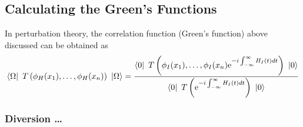\documentclass[11pt, notitlepage]{report}
\newcommand{\e}{\mathrm{e}}
\numberwithin{equation}{section}
\begin{document}
\subsection{Calculating the Green's Functions}
In perturbation theory, the correlation function (Green's function) above discussed can be obtained as 
\begin{equation}
    \bra{\Omega} ~T\left( \phi_H(x_1),\ldots,\phi_H(x_n)  \right)~ \ket{\Omega} = \frac{\bra{0} ~T\left( \phi_I(x_1),\ldots,\phi_I(x_n)  \e^{-i\int_{-\infty}^{\infty}H_I(t)dt}\right)~ \ket{0} }{\bra{0}~T\left( \e^{-i\int_{-\infty}^{\infty}H_I(t)dt}\right)~\ket{0}}
    \label{eq:correlation_fun}
\end{equation}

\subsubsection{Diversion \ldots}
\end{document}
